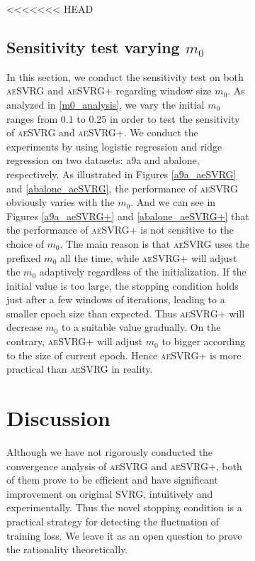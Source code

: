 \documentclass[conference]{IEEEtran}
\begin{document}
\begin{algorithm}[t]
\begin{itemize}
\begin{figure}[ht]
\begin{figure}[ht]
<<<<<<< HEAD
 
\subsection{Sensitivity test varying  $m_0$}
In this section, we conduct the sensitivity test on both \textsc{aeSVRG} and \textsc{aeSVRG+} regarding window size $m_0$. As analyzed in \ref{m0_analysis}, we vary the initial $m_0$ ranges from $0.1$ to $0.25$ in order to test the sensitivity of \textsc{aeSVRG} and \textsc{aeSVRG+}. We conduct the experiments by using logistic regression and ridge regression on two datasets: a9a and abalone, respectively. As illustrated in Figures \ref{a9a_aeSVRG} and \ref{abalone_aeSVRG}, the performance of \textsc{aeSVRG} obviously varies with the $m_0$. And we can see in Figures \ref{a9a_aeSVRG+} and \ref{abalone_aeSVRG+} that the performance of \textsc{aeSVRG+} is not sensitive to the choice of $m_0$. 
The main reason is that \textsc{aeSVRG} uses the prefixed $m_0$ all the time, while \textsc{aeSVRG+} will adjust the $m_0$ adaptively regardless of the initialization.
If the initial value is too large, the stopping condition holds just after a few windows of iterations, leading to a smaller epoch size than expected.
Thus \textsc{aeSVRG+} will decrease $m_0$ to a suitable value gradually. On the contrary, \textsc{aeSVRG+} will adjust $m_0$ to bigger according to the size of current epoch.  
Hence \textsc{aeSVRG+} is more practical than \textsc{aeSVRG} in reality.

\section{Discussion}
\label{discussion}
Although we have not rigorously conducted the convergence analysis of \textsc{aeSVRG} and \textsc{aeSVRG+}, both of them prove to be efficient and have significant improvement on original SVRG,  intuitively and experimentally. Thus the novel stopping condition is a practical strategy for detecting the fluctuation of training loss. We leave it as an open question to prove the rationality theoretically.


\end{figure}
\end{figure}
\end{itemize}
\end{algorithm}
\end{document}
